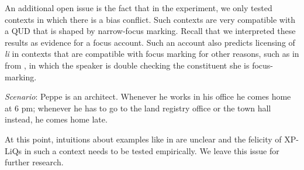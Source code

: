 \documentclass[output=paper,
colorlinks,
citecolor=brown,
newtxmath
]{langscibook}
\begin{document}




An additional open issue is the fact that in the experiment, we only tested contexts in which there is a bias conflict. Such contexts are very compatible with a QUD that is shaped by narrow-focus marking. Recall that we interpreted these results as evidence for a focus account. Such an account also predicts licensing of \textit{li} in contexts that are compatible with focus marking for other reasons, such as in  from \citet{bianchi.bocci.cruschina2016}, in which the speaker is double checking the constituent she is focus-marking.


\eanoraggedright
\textit{Scenario}: Peppe is an architect. Whenever he works in his office he comes home at 6 pm; whenever he has to go to the land registry office or the town hall instead, he comes home late.
\begin{xlist}
\end{xlist}\label{doubleask}
\z

\noindent
At this point, intuitions about examples like  in  are unclear and the felicity of XP-LiQs in such a context needs to be tested empirically. We leave this issue for further research.
\end{document}
